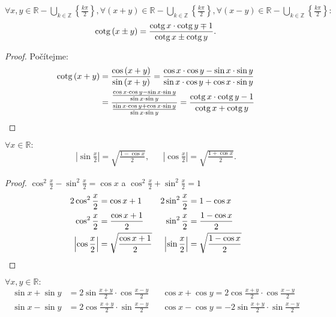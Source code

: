 \begin{veta}
  $\forall x,y\in\mathbb{R}-\bigcup\limits_{k\in\mathbb{Z}} \left\{\frac{k\pi}{2}\right\}, \forall (x+y) \in \mathbb{R}-\bigcup\limits_{k\in\mathbb{Z}} \left\{\frac{k\pi}{2}\right\}, \forall (x-y) \in \mathbb{R}-\bigcup\limits_{k\in\mathbb{Z}} \left\{\frac{k\pi}{2}\right\}:$
  $$\operatorname{cotg}\left(x\pm y\right) = \frac{\operatorname{cotg} x \cdot \operatorname{cotg} y \mp 1}{\operatorname{cotg} x \pm \operatorname{cotg} y}.$$
\end{veta}

\begin{proof}
    Počítejme:
    \begin{align*}
        \operatorname{cotg} \left(x+y\right) & = \frac{\cos \left(x+y\right)}{\sin \left(x+y\right)}=\frac{\cos x \cdot \cos y - \sin x\cdot  \sin y}{\sin x\cdot  \cos y + \cos x\cdot  \sin y}\\
       &  = \frac{\frac{\cos x\cdot  \cos y - \sin x \cdot \sin y}{\sin x \cdot \sin y}}{\frac{\sin x \cdot \cos y + \cos x\cdot  \sin y}{\sin x\cdot  \sin y}}=\frac{\operatorname{cotg} x \cdot \operatorname{cotg} y-1}{\operatorname{cotg} x + \operatorname{cotg} y}\qedhere
    \end{align*}
\end{proof}

\begin{veta}
    $\forall x \in \mathbb{R}:$
    \begin{align*}
        \left| \sin \frac{x}{2} \right| = \sqrt{\frac{1-\cos x}{2}}, & & \left| \cos \frac{x}{2}\right| = \sqrt{\frac{1+\cos x}{2}}.
    \end{align*}
\end{veta}

\begin{proof}
  $\cos^2 \frac{x}{2} - \sin^2 \frac{x}{2} = \cos x$ a
  $\cos^2 \frac{x}{2} + \sin^2 \frac{x}{2} =1 $
  \begin{align*}
    2\cos^2 \frac{x}{2}&=\cos x +1 & 2\sin^2 \frac{x}{2} & =1-\cos x \\
    \cos^2 \frac{x}{2}&=\frac{\cos x +1}{2} & \sin^2 \frac{x}{2} & =\frac{1-\cos x }{2} \\
    \left| \cos \frac{x}{2} \right| &= \sqrt{\frac{\cos x +1}{2}} & \left| \sin \frac{x}{2} \right | & = \sqrt{\frac{1-\cos x}{2}}\qedhere
  \end{align*}
\end{proof}

\begin{veta}
  $\forall x,y \in \mathbb{R}:$
  \begin{align*}
    \sin x + \sin y &= 2\sin \frac{x+y}{2}\cdot \cos \frac{x-y}{2}& & \cos x + \cos y = 2 \cos \frac{x + y}{2}\cdot \cos \frac{x - y}{2}\\
    \sin x - \sin y &= 2\cos \frac{x + y}{2}\cdot \sin \frac{x - y}{2}& & \cos x - \cos y =-2\sin \frac{x + y}{2}\cdot \sin \frac{x -y}{2}
  \end{align*}
\end{veta}


